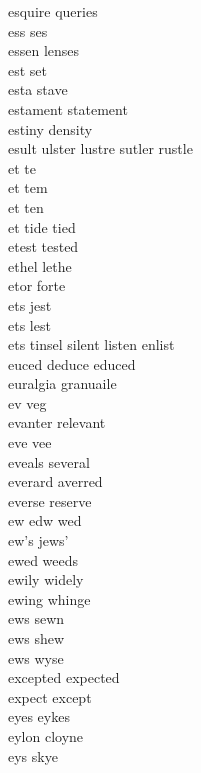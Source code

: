 esquire queries\\
ess ses\\
essen lenses \\
est set\\
esta stave \\
estament statement \\
estiny density \\
esult ulster lustre sutler rustle \\
et te\\
et tem \\
et ten \\
et tide tied  \\
etest tested \\
ethel lethe\\
etor forte \\
ets jest \\
ets lest \\
ets tinsel silent listen enlist   \\
euced deduce educed \\
euralgia granuaile \\
ev veg \\
evanter relevant \\
eve vee\\
eveals several \\
everard averred\\
everse reserve \\
ew edw wed \\
ew's jews' \\
ewed weeds \\
ewily widely \\
ewing whinge \\
ews sewn \\
ews shew \\
ews wyse \\
excepted expected\\
expect except\\
eyes eykes \\
eylon cloyne \\
eys skye \\

